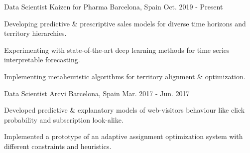 
\begin{cventries}

\cventry
  {Data Scientist}
  {Kaizen for Pharma}
  {Barcelona, Spain}
  {Oct. 2019 - Present}
  {
    \begin{cvitems}
      \item {Developing predictive \& prescriptive sales models for diverse time horizons and territory hierarchies.}
      \item {Experimenting with state-of-the-art deep learning methods for time series interpretable forecasting.}
      \item {Implementing metaheuristic algorithms for territory alignment \& optimization.}
    \end{cvitems}
  }

\cventry
  {Data Scientist}
  {Arcvi}
  {Barcelona, Spain}
  {Mar. 2017 - Jun. 2017}
  {
    \begin{cvitems}
      \item {Developed predictive \& explanatory models of web-visitors behaviour like click probability and subscription look-alike.}
      \item {Implemented a prototype of an adaptive assignment optimization system with different constraints and heuristics.}
    \end{cvitems}
  }

\end{cventries}
